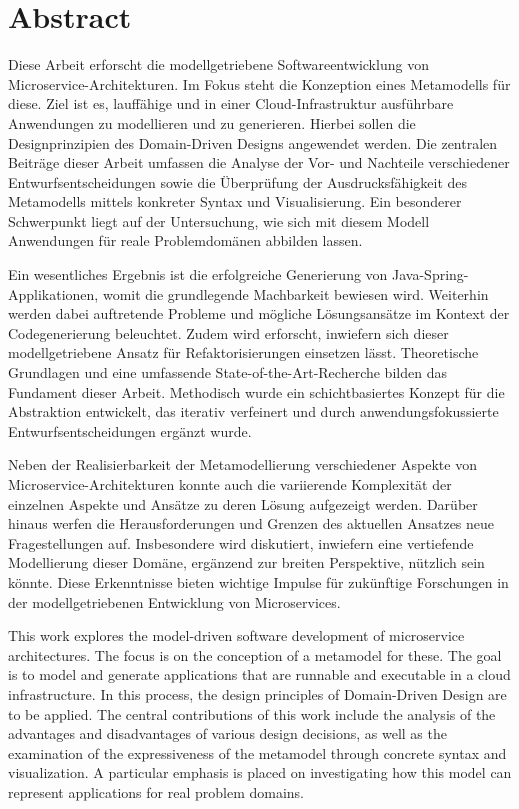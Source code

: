 \chapter{Abstract}

Diese Arbeit erforscht die modellgetriebene Softwareentwicklung von Microservice-Architekturen. Im Fokus steht die Konzeption eines Metamodells für diese. Ziel ist es, lauffähige und in einer Cloud-Infrastruktur ausführbare Anwendungen zu modellieren und zu generieren. Hierbei sollen die Designprinzipien des Domain-Driven Designs angewendet werden. Die zentralen Beiträge dieser Arbeit umfassen die Analyse der Vor- und Nachteile verschiedener Entwurfsentscheidungen sowie die Überprüfung der Ausdrucksfähigkeit des Metamodells mittels konkreter Syntax und Visualisierung. Ein besonderer Schwerpunkt liegt auf der Untersuchung, wie sich mit diesem Modell Anwendungen für reale Problemdomänen abbilden lassen.

Ein wesentliches Ergebnis ist die erfolgreiche Generierung von Java-Spring-Applikationen, womit die grundlegende Machbarkeit bewiesen wird. Weiterhin werden dabei auftretende Probleme und mögliche Lösungsansätze im Kontext der Codegenerierung beleuchtet. Zudem wird erforscht, inwiefern sich dieser modellgetriebene Ansatz für Refaktorisierungen einsetzen lässt. Theoretische Grundlagen und eine umfassende State-of-the-Art-Recherche bilden das Fundament dieser Arbeit. Methodisch wurde ein schichtbasiertes Konzept für die Abstraktion entwickelt, das iterativ verfeinert und durch anwendungsfokussierte Entwurfsentscheidungen ergänzt wurde.

Neben der Realisierbarkeit der Metamodellierung verschiedener Aspekte von Microservice-Architekturen konnte auch die variierende Komplexität der einzelnen Aspekte und Ansätze zu deren Lösung aufgezeigt werden. Darüber hinaus werfen die Herausforderungen und Grenzen des aktuellen Ansatzes neue Fragestellungen auf. Insbesondere wird diskutiert, inwiefern eine vertiefende Modellierung dieser Domäne, ergänzend zur breiten Perspektive, nützlich sein könnte. Diese Erkenntnisse bieten wichtige Impulse für zukünftige Forschungen in der modellgetriebenen Entwicklung von Microservices.

\newpage

This work explores the model-driven software development of microservice architectures. The focus is on the conception of a metamodel for these. The goal is to model and generate applications that are runnable and executable in a cloud infrastructure. In this process, the design principles of Domain-Driven Design are to be applied. The central contributions of this work include the analysis of the advantages and disadvantages of various design decisions, as well as the examination of the expressiveness of the metamodel through concrete syntax and visualization. A particular emphasis is placed on investigating how this model can represent applications for real problem domains.


